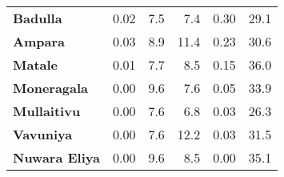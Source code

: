 \begin{tabular}{lrrrrr}
\textbf{Badulla     } &        0.02 &         7.5 &          7.4 &             0.30 &        29.1 \\
\textbf{Ampara      } &        0.03 &         8.9 &         11.4 &             0.23 &        30.6 \\
\textbf{Matale      } &        0.01 &         7.7 &          8.5 &             0.15 &        36.0 \\
\textbf{Moneragala  } &        0.00 &         9.6 &          7.6 &             0.05 &        33.9 \\
\textbf{Mullaitivu  } &        0.00 &         7.6 &          6.8 &             0.03 &        26.3 \\
\textbf{Vavuniya    } &        0.00 &         7.6 &         12.2 &             0.03 &        31.5 \\
\textbf{Nuwara Eliya} &        0.00 &         9.6 &          8.5 &             0.00 &        35.1 \\
\bottomrule
\end{tabular}
